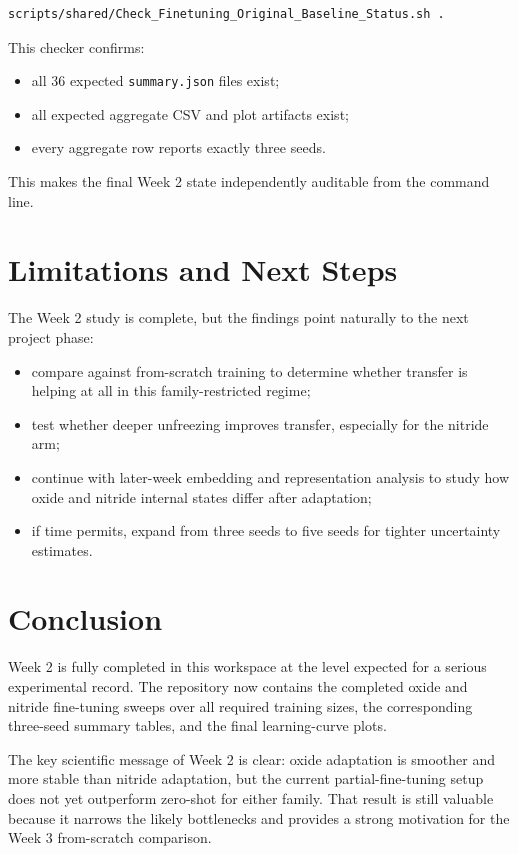 \documentclass[11pt]{article}
\begin{document}
\begin{lstlisting}[language=bash]
scripts/shared/Check_Finetuning_Original_Baseline_Status.sh .
\end{lstlisting}

This checker confirms:
\begin{itemize}
  \item all 36 expected \texttt{summary.json} files exist;
  \item all expected aggregate CSV and plot artifacts exist;
  \item every aggregate row reports exactly three seeds.
\end{itemize}

This makes the final Week 2 state independently auditable from the command line.

\section{Limitations and Next Steps}
The Week 2 study is complete, but the findings point naturally to the next project phase:
\begin{itemize}
  \item compare against from-scratch training to determine whether transfer is helping at all in this family-restricted regime;
  \item test whether deeper unfreezing improves transfer, especially for the nitride arm;
  \item continue with later-week embedding and representation analysis to study how oxide and nitride internal states differ after adaptation;
  \item if time permits, expand from three seeds to five seeds for tighter uncertainty estimates.
\end{itemize}

\section{Conclusion}
Week 2 is fully completed in this workspace at the level expected for a serious experimental record.
The repository now contains the completed oxide and nitride fine-tuning sweeps over all required training sizes, the corresponding three-seed summary tables, and the final learning-curve plots.

The key scientific message of Week 2 is clear:
oxide adaptation is smoother and more stable than nitride adaptation, but the current partial-fine-tuning setup does not yet outperform zero-shot for either family.
That result is still valuable because it narrows the likely bottlenecks and provides a strong motivation for the Week 3 from-scratch comparison.
\end{document}
